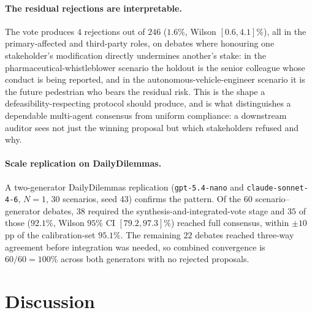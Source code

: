 \documentclass[11pt]{article}
\begin{document}
\paragraph{The residual rejections are interpretable.}
The vote produces $4$ rejections out of $246$ ($1.6\%$, Wilson
$[0.6, 4.1]\%$), all in the primary-affected and
third-party roles, on debates where honouring one
stakeholder's modification directly undermines another's stake: in
the pharmaceutical-whistleblower scenario the holdout is the senior
colleague whose conduct is being reported, and in the
autonomous-vehicle-engineer scenario it is the future pedestrian who
bears the residual risk. This is the
shape a defeasibility-respecting protocol should produce, and is
what distinguishes a dependable multi-agent consensus from uniform
compliance: a downstream auditor sees not just the winning proposal
but which stakeholders refused and why.

\paragraph{Scale replication on DailyDilemmas.} A two-generator
DailyDilemmas replication (\texttt{gpt-5.4-nano} and
\texttt{claude-sonnet-4-6}, $N{=}1$, 30 scenarios, seed 43)
confirms the pattern. Of the $60$ scenario--generator debates, $38$
required the synthesis-and-integrated-vote stage and $35$ of those
($92.1\%$, Wilson $95\%$ CI $[79.2, 97.3]\%$) reached full
consensus, within $\pm 10$\,pp of the calibration-set $95.1\%$. The
remaining $22$ debates reached three-way agreement before integration
was needed, so combined convergence is $60/60 = 100\%$ across both
generators with no rejected proposals.

\section{Discussion}
\label{sec:grounding}
\end{document}
